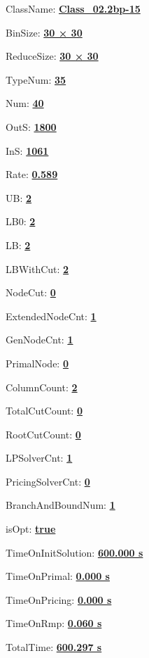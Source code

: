 \documentclass[11pt]{article}
\begin{document}
\pagestyle{empty}


ClassName: \underline{\textbf{Class_02.2bp-15}}
\par
BinSize: \underline{\textbf{30 × 30}}
\par
ReduceSize: \underline{\textbf{30 × 30}}
\par
TypeNum: \underline{\textbf{35}}
\par
Num: \underline{\textbf{40}}
\par
OutS: \underline{\textbf{1800}}
\par
InS: \underline{\textbf{1061}}
\par
Rate: \underline{\textbf{0.589}}
\par
UB: \underline{\textbf{2}}
\par
LB0: \underline{\textbf{2}}
\par
LB: \underline{\textbf{2}}
\par
LBWithCut: \underline{\textbf{2}}
\par
NodeCut: \underline{\textbf{0}}
\par
ExtendedNodeCnt: \underline{\textbf{1}}
\par
GenNodeCnt: \underline{\textbf{1}}
\par
PrimalNode: \underline{\textbf{0}}
\par
ColumnCount: \underline{\textbf{2}}
\par
TotalCutCount: \underline{\textbf{0}}
\par
RootCutCount: \underline{\textbf{0}}
\par
LPSolverCnt: \underline{\textbf{1}}
\par
PricingSolverCnt: \underline{\textbf{0}}
\par
BranchAndBoundNum: \underline{\textbf{1}}
\par
isOpt: \underline{\textbf{true}}
\par
TimeOnInitSolution: \underline{\textbf{600.000 s}}
\par
TimeOnPrimal: \underline{\textbf{0.000 s}}
\par
TimeOnPricing: \underline{\textbf{0.000 s}}
\par
TimeOnRmp: \underline{\textbf{0.060 s}}
\par
TotalTime: \underline{\textbf{600.297 s}}
\par
\newpage
\end{document}
